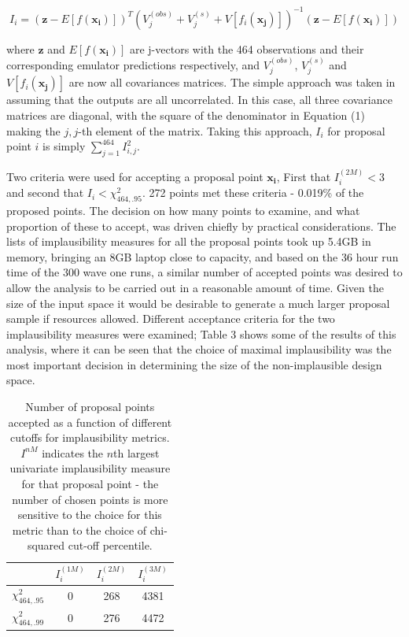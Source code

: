 \documentclass[
  12pt,
  a4paper,
  twoside]{book}
\begin{document}
\begin{equation}
\label{eq:implausibility2}
I_{i} = \left( \mathbf{z} - E[f(\mathbf{x_i})] \right)^T \left(V_j^{(obs)} + V^{(s)}_j + V[f_i(\mathbf{x_j})] \right)^{-1} \left( \mathbf{z} - E[f(\mathbf{x_i})] \right)
\end{equation}

where \(\mathbf{z}\) and \(E[f(\mathbf{x_i})]\) are j-vectors with the 464 observations and their corresponding emulator predictions respectively, and \(V_j^{(obs)}\), \(V^{(s)}_j\) and \(V[f_i(\mathbf{x_j})]\) are now all covariances matrices. The simple approach was taken in assuming that the outputs are all uncorrelated. In this case, all three covariance matrices are diagonal, with the square of the denominator in Equation (1) making the \(j,j\)-th element of the matrix. Taking this approach, \(I_i\) for proposal point \(i\) is simply \(\sum_{j=1}^{464} I^2_{i,j}\).

Two criteria were used for accepting a proposal point \(\mathbf{x_i}\), First that \(I_i^{(2M)}<3\) and second that \(I_i < \chi^2_{464,.95}\). 272 points met these criteria - 0.019\% of the proposed points. The decision on how many points to examine, and what proportion of these to accept, was driven chiefly by practical considerations. The lists of implausibility measures for all the proposal points took up 5.4GB in memory, bringing an 8GB laptop close to capacity, and based on the 36 hour run time of the 300 wave one runs, a similar number of accepted points was desired to allow the analysis to be carried out in a reasonable amount of time. Given the size of the input space it would be desirable to generate a much larger proposal sample if resources allowed. Different acceptance criteria for the two implausibility measures were examined; Table 3 shows some of the results of this analysis, where it can be seen that the choice of maximal implausibility was the most important decision in determining the size of the non-implausible design space.

\begin{table}\centering
\caption{Number of proposal points accepted as a function of different cutoffs for implausibility metrics. $I^{nM}$ indicates the $n$th largest univariate implausibility measure for that proposal point - the number of chosen points is more sensitive to the choice for this metric than to the choice of chi-squared cut-off percentile.}
\begin{tabular}{cccc}\\
&$I_i^{(1M)}$&$I_i^{(2M)}$&$I_i^{(3M)}$\\
\hline
$\chi^2_{464,.95}$& 0 & 268 & 4381 \\
$\chi^2_{464,.99}$& 0 & 276  & 4472 \\
\hline
\end{tabular}
\end{table}
\end{document}
